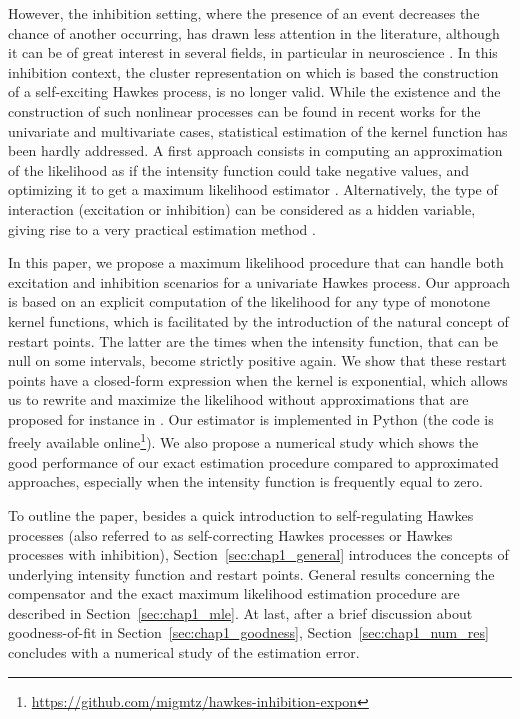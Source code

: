 However, the inhibition setting, where the presence of an event decreases the chance of another occurring, has drawn less attention in the literature, although it can be of great interest in several fields, in particular in neuroscience \parencite{Lambert2018}. In this inhibition context, the cluster representation \parencite{Hawkes1974} on which is based the construction of a self-exciting Hawkes process, is no longer valid.
While the existence and the construction of such nonlinear processes can be found in recent works for the univariate \parencite{Costa2020} and multivariate \parencite{Chen2017} cases,
statistical estimation of the kernel function has been hardly addressed.
A first approach consists in computing an approximation of the likelihood as if the intensity function could take negative values, and optimizing it to get a maximum likelihood estimator \parencite{Lemonnier2014}.
Alternatively, the type of interaction (excitation or inhibition) can be considered as a hidden variable, giving rise to a very practical estimation method \parencite{Mei2017}.

In this paper, we propose a maximum likelihood procedure that can handle both excitation and inhibition scenarios for a univariate Hawkes process. Our approach is based on an explicit computation of the likelihood for any type of monotone kernel functions, which is facilitated by the introduction of the natural concept of restart points. The latter are the times when the intensity function, that can be null on some intervals, become strictly positive again. We show that these restart points have a closed-form expression when the kernel is exponential, which allows us to rewrite and maximize the likelihood without approximations that are proposed for instance in \textcite{Lemonnier2014}.  Our estimator is implemented in Python (the code is freely available online\footnote{\url{https://github.com/migmtz/hawkes-inhibition-expon}}). We also propose a numerical study which shows the good performance of our exact estimation procedure compared to approximated approaches, especially when the intensity function is frequently equal to zero.

To outline the paper, besides a quick introduction to self-regulating Hawkes processes (also referred to as self-correcting Hawkes processes or Hawkes processes with inhibition), Section~\ref{sec:chap1_general} introduces the concepts of underlying intensity function and restart points.
General results concerning the compensator and the exact maximum likelihood estimation procedure are described in Section~\ref{sec:chap1_mle}.
At last, after a brief discussion about goodness-of-fit in Section~\ref{sec:chap1_goodness},
Section~\ref{sec:chap1_num_res} concludes with a numerical study of the estimation error.

